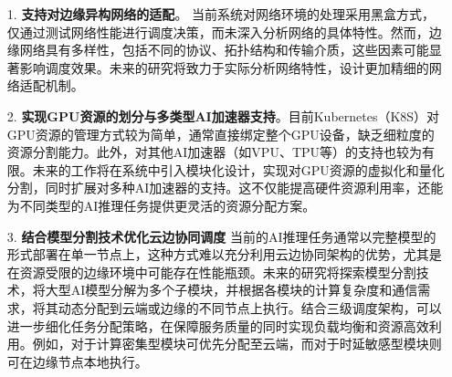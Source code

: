 \begin{enumerate}
    \item[1.] \textbf{支持对边缘异构网络的适配}。 当前系统对网络环境的处理采用黑盒方式，仅通过测试网络性能进行调度决策，而未深入分析网络的具体特性。然而，边缘网络具有多样性，包括不同的协议、拓扑结构和传输介质，这些因素可能显著影响调度效果。未来的研究将致力于实际分析网络特性，设计更加精细的网络适配机制。
    \item[2.] \textbf{实现GPU资源的划分与多类型AI加速器支持}。目前Kubernetes（K8S）对GPU资源的管理方式较为简单，通常直接绑定整个GPU设备，缺乏细粒度的资源分割能力。此外，对其他AI加速器（如VPU、TPU等）的支持也较为有限。未来的工作将在系统中引入模块化设计，实现对GPU资源的虚拟化和量化分割，同时扩展对多种AI加速器的支持。这不仅能提高硬件资源利用率，还能为不同类型的AI推理任务提供更灵活的资源分配方案。
    \item[3.] \textbf{结合模型分割技术优化云边协同调度} 当前的AI推理任务通常以完整模型的形式部署在单一节点上，这种方式难以充分利用云边协同架构的优势，尤其是在资源受限的边缘环境中可能存在性能瓶颈。未来的研究将探索模型分割技术，将大型AI模型分解为多个子模块，并根据各模块的计算复杂度和通信需求，将其动态分配到云端或边缘的不同节点上执行。结合三级调度架构，可以进一步细化任务分配策略，在保障服务质量的同时实现负载均衡和资源高效利用。例如，对于计算密集型模块可优先分配至云端，而对于时延敏感型模块则可在边缘节点本地执行。
\end{enumerate}
